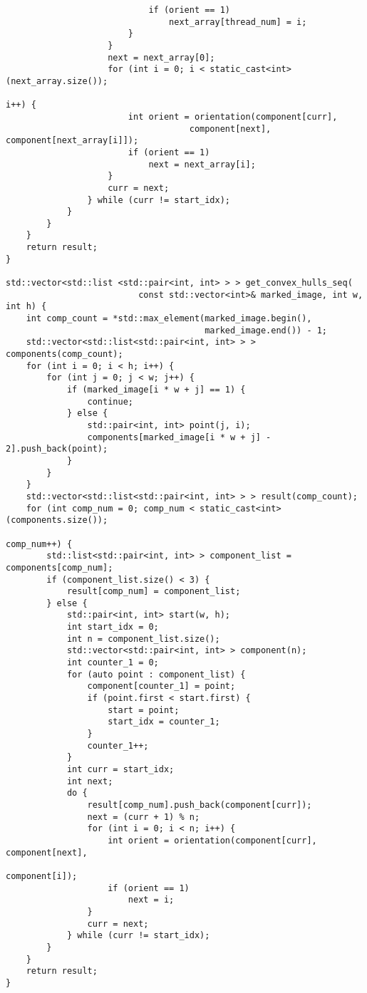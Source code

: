 \documentclass{report}
\begin{document}
\begin{lstlisting}
                            if (orient == 1)
                                next_array[thread_num] = i;
                        }
                    }
                    next = next_array[0];
                    for (int i = 0; i < static_cast<int>(next_array.size());
                                                                         i++) {
                        int orient = orientation(component[curr],
                                    component[next], component[next_array[i]]);
                        if (orient == 1)
                            next = next_array[i];
                    }
                    curr = next;
                } while (curr != start_idx);
            }
        }
    }
    return result;
}

std::vector<std::list <std::pair<int, int> > > get_convex_hulls_seq(
                          const std::vector<int>& marked_image, int w, int h) {
    int comp_count = *std::max_element(marked_image.begin(),
                                       marked_image.end()) - 1;
    std::vector<std::list<std::pair<int, int> > > components(comp_count);
    for (int i = 0; i < h; i++) {
        for (int j = 0; j < w; j++) {
            if (marked_image[i * w + j] == 1) {
                continue;
            } else {
                std::pair<int, int> point(j, i);
                components[marked_image[i * w + j] - 2].push_back(point);
            }
        }
    }
    std::vector<std::list<std::pair<int, int> > > result(comp_count);
    for (int comp_num = 0; comp_num < static_cast<int>(components.size());
                                                                  comp_num++) {
        std::list<std::pair<int, int> > component_list = components[comp_num];
        if (component_list.size() < 3) {
            result[comp_num] = component_list;
        } else {
            std::pair<int, int> start(w, h);
            int start_idx = 0;
            int n = component_list.size();
            std::vector<std::pair<int, int> > component(n);
            int counter_1 = 0;
            for (auto point : component_list) {
                component[counter_1] = point;
                if (point.first < start.first) {
                    start = point;
                    start_idx = counter_1;
                }
                counter_1++;
            }
            int curr = start_idx;
            int next;
            do {
                result[comp_num].push_back(component[curr]);
                next = (curr + 1) % n;
                for (int i = 0; i < n; i++) {
                    int orient = orientation(component[curr], component[next],
                                                                 component[i]);
                    if (orient == 1)
                        next = i;
                }
                curr = next;
            } while (curr != start_idx);
        }
    }
    return result;
}
\end{lstlisting}
\end{document}
